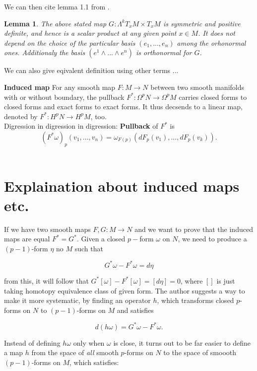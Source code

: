 \documentclass[licencjacka]{pracamgr}
\theoremstyle{definition}
\theoremstyle{definition}
\theoremstyle{plain}
\newtheorem{lemma}{Lemma}[section]
\theoremstyle{plain}
\begin{document}
We can then cite lemma 1.1 from \cite{lausanne}.

\begin{lemma}
The above stated map $G: \Lambda^k T_x M \times T_x M $ is symmetric and positive
definite, and hence is a scalar product at any given point $x \in M$. It does not depend
on the choice of the particular basis $(e_1, ..., e_n)$ among the orhonormal
ones. Additionaly the basis $(e^1 \wedge ... \wedge e^n)$ is orthonormal for $G$.
\end{lemma}

We can also give eqivalent definition using other terms ...


\textbf{Induced map} For any smooth map $F:
M \rightarrow N$ between two smooth manifolds with or without
boundary, the pullback $F^\ast: \Omega^p N \rightarrow \Omega^p M$
carries closed forms to closed forms and exact forms to exact
forms. It thus decsends to a linear map, denoted by $F^\ast: H^p N
\rightarrow H^p M$, too. \\

Digression in digression in digression: \textbf{Pullback} of $F^\ast$ is
\[
    (F^\ast \omega)_p(v_1, ..., v_n) =
        \omega_{F(p)}(dF_p(v_1), ..., dF_p(v_k)).
\] \\


\section{Explaination about induced maps etc.}

If we have two smooth maps $F, G:
M \rightarrow N$ and we want to prove that the induced maps are equal
$F^\ast = G^\ast$. Given a closed $p-$form $\omega$ on $N$, we need to
produce a $(p-1)$-form $\eta$ no $M$ such that

\[
    G^\ast \omega - F^\ast \omega = d\eta
\]

from this, it will follow that $ G^\ast [\omega] - F^\ast [\omega] =
[d\eta] = 0$, where $[]$ is just taking homotopy equivalence class
of given form. The author suggests a way to make it more systematic,
by finding an operator $h$, which transforms closed $p$-forms on $N$
to $(p-1)$-forms on $M$ and satisfies

\[
    d(h\omega) = G^\ast \omega - F^\ast \omega.
\]

Instead of defining $h\omega$ only when $\omega$ is close, it turns
out to be far easier to define a map $h$ from the space of
\textit{all} smooth $p$-forms on $N$ to the space of smoooth
$(p-1)$-forms on $M$, which satisfies:
\end{document}
